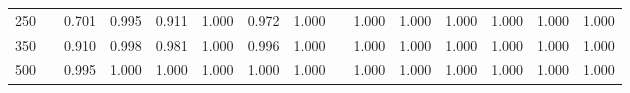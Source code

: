 % 
\begin{tabular}{ccccccccccccccc}
  \hline
  \hline
250 &  & 0.701 & 0.995 & 0.911 & 1.000 & 0.972 & 1.000 &  & 1.000 & 1.000 & 1.000 & 1.000 & 1.000 & 1.000 \\ 
  350 &  & 0.910 & 0.998 & 0.981 & 1.000 & 0.996 & 1.000 &  & 1.000 & 1.000 & 1.000 & 1.000 & 1.000 & 1.000 \\ 
  500 &  & 0.995 & 1.000 & 1.000 & 1.000 & 1.000 & 1.000 &  & 1.000 & 1.000 & 1.000 & 1.000 & 1.000 & 1.000 \\ 
   \hline
\end{tabular}
